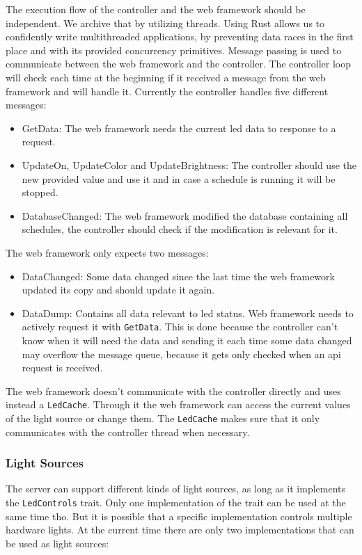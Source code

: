 \documentclass[conference]{IEEEtran}
\begin{document}
The execution flow of the controller and the web framework should be independent. We archive that by utilizing threads. Using Rust 
allows us to confidently write multithreaded applications\cite{rust:con}, by preventing data races in the first place and with its
provided concurrency primitives. Message passing is used to communicate between the web framework and the controller. The controller
loop will check each time at the beginning if it received a message from the web framework and will handle it. Currently the
controller handles five different messages:
\begin{itemize}
    \item GetData:
    The web framework needs the current led data to response to a request.
    \item UpdateOn, UpdateColor and UpdateBrightness:
    The controller should use the new provided value and use it and in case a schedule is running it will be stopped.
    \item DatabaseChanged:
    The web framework modified the database containing all schedules, the controller should check if the modification is relevant
    for it.
\end{itemize}

The web framework only expects two messages:
\begin{itemize}
    \item DataChanged: 
    Some data changed since the last time the web framework updated its copy and should update it again.
    \item DataDump:
    Contains all data relevant to led status. Web framework needs to actively request it with \texttt{GetData}. This is done
     because the controller can't know when it will need the data and sending it each time some data changed may overflow the
      message queue, because it gets only checked when an api request is received.
\end{itemize}

The web framework doesn't communicate with the controller directly and uses instead a \texttt{LedCache}. Through it the web 
framework can access the current values of the light source or change them. The \texttt{LedCache} makes sure that it only communicates
with the controller thread when necessary.


\subsubsection{Light Sources}
The server can support different kinds of light sources, as long as it implements the \texttt{LedControls} trait. Only one
implementation of the trait can be used at the same time tho. But it is possible that a specific implementation controls multiple
hardware lights. At the current time there are only two implementations that can be used as light sources:
\end{document}
